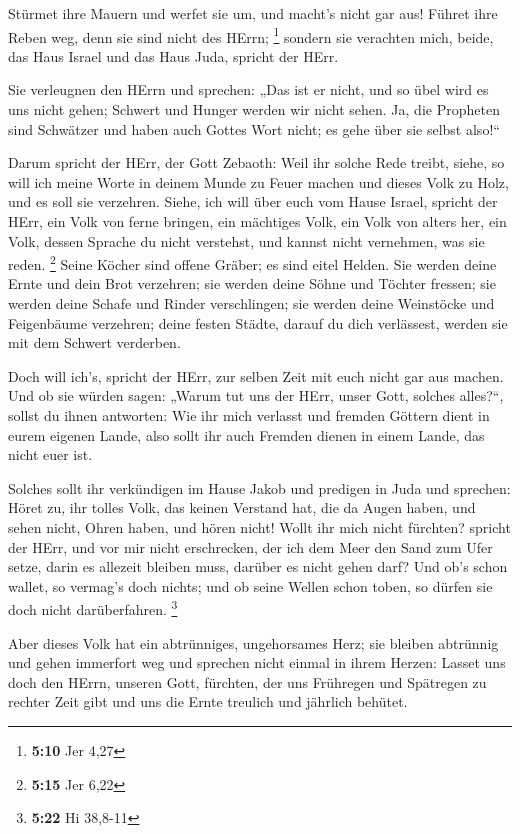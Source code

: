  Stürmet ihre Mauern und werfet sie um, und macht's nicht
gar aus! Führet ihre Reben weg, denn sie sind nicht des HErrn;
\footnote{\textbf{5:10} Jer 4,27}  sondern sie verachten
mich, beide, das Haus Israel und das Haus Juda, spricht der HErr.

 Sie verleugnen den HErrn und sprechen: „Das ist er nicht,
und so übel wird es uns nicht gehen; Schwert und Hunger werden wir nicht
sehen.  Ja, die Propheten sind Schwätzer und haben auch
Gottes Wort nicht; es gehe über sie selbst also!{}``

 Darum spricht der HErr, der Gott Zebaoth: Weil ihr solche
Rede treibt, siehe, so will ich meine Worte in deinem Munde zu Feuer
machen und dieses Volk zu Holz, und es soll sie verzehren. 
Siehe, ich will über euch vom Hause Israel, spricht der HErr, ein Volk
von ferne bringen, ein mächtiges Volk, ein Volk von alters her, ein
Volk, dessen Sprache du nicht verstehst, und kannst nicht vernehmen, was
sie reden. \footnote{\textbf{5:15} Jer 6,22}  Seine Köcher
sind offene Gräber; es sind eitel Helden.  Sie werden deine
Ernte und dein Brot verzehren; sie werden deine Söhne und Töchter
fressen; sie werden deine Schafe und Rinder verschlingen; sie werden
deine Weinstöcke und Feigenbäume verzehren; deine festen Städte, darauf
du dich verlässest, werden sie mit dem Schwert verderben.

 Doch will ich's, spricht der HErr, zur selben Zeit mit
euch nicht gar aus machen.  Und ob sie würden sagen: „Warum
tut uns der HErr, unser Gott, solches alles?{}``, sollst du ihnen
antworten: Wie ihr mich verlasst und fremden Göttern dient in eurem
eigenen Lande, also sollt ihr auch Fremden dienen in einem Lande, das
nicht euer ist.

 Solches sollt ihr verkündigen im Hause Jakob und predigen
in Juda und sprechen:  Höret zu, ihr tolles Volk, das
keinen Verstand hat, die da Augen haben, und sehen nicht, Ohren haben,
und hören nicht!  Wollt ihr mich nicht fürchten? spricht
der HErr, und vor mir nicht erschrecken, der ich dem Meer den Sand zum
Ufer setze, darin es allezeit bleiben muss, darüber es nicht gehen darf?
Und ob's schon wallet, so vermag's doch nichts; und ob seine Wellen
schon toben, so dürfen sie doch nicht darüberfahren. \footnote{\textbf{5:22}
  Hi 38,8-11}

 Aber dieses Volk hat ein abtrünniges, ungehorsames Herz;
sie bleiben abtrünnig und gehen immerfort weg  und sprechen
nicht einmal in ihrem Herzen: Lasset uns doch den HErrn, unseren Gott,
fürchten, der uns Frühregen und Spätregen zu rechter Zeit gibt und uns
die Ernte treulich und jährlich behütet.

